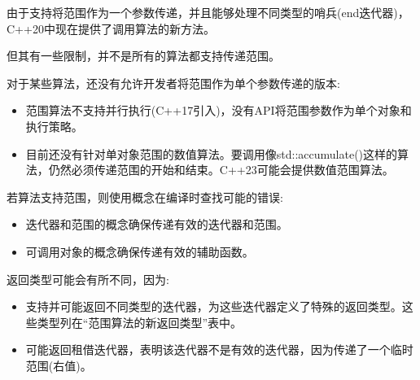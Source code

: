 
由于支持将范围作为一个参数传递，并且能够处理不同类型的哨兵(end迭代器)，C++20中现在提供了调用算法的新方法。

但其有一些限制，并不是所有的算法都支持传递范围。


对于某些算法，还没有允许开发者将范围作为单个参数传递的版本:

\begin{itemize}
\item
范围算法不支持并行执行(C++17引入)，没有API将范围参数作为单个对象和执行策略。

\item
目前还没有针对单对象范围的数值算法。要调用像std::accumulate()这样的算法，仍然必须传递范围的开始和结束。C++23可能会提供数值范围算法。
\end{itemize}

若算法支持范围，则使用概念在编译时查找可能的错误:

\begin{itemize}
\item
迭代器和范围的概念确保传递有效的迭代器和范围。

\item
可调用对象的概念确保传递有效的辅助函数。
\end{itemize}

返回类型可能会有所不同，因为:

\begin{itemize}
\item
支持并可能返回不同类型的迭代器，为这些迭代器定义了特殊的返回类型。这些类型列在“范围算法的新返回类型”表中。

\item
可能返回租借迭代器，表明该迭代器不是有效的迭代器，因为传递了一个临时范围(右值)。
\end{itemize}

